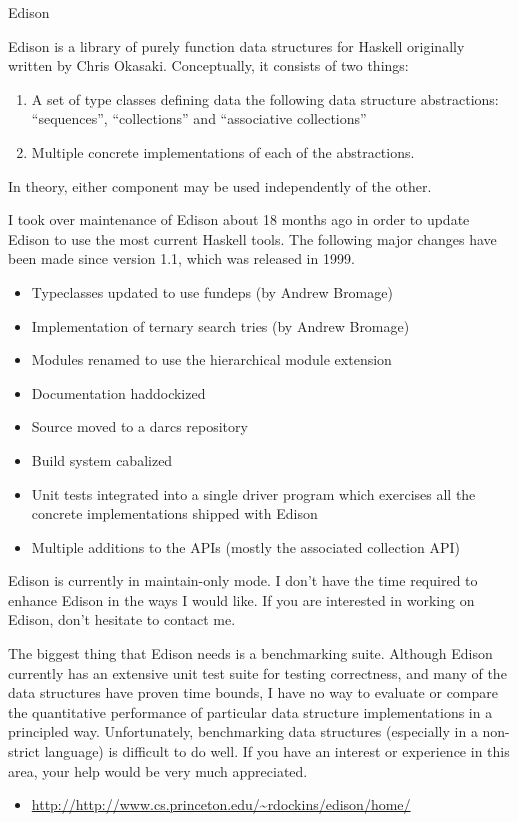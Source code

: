 \documentclass{article}
\begin{document}
\begin{hcarentry}{Edison}
\makeheader

Edison is a library of purely function data structures for Haskell
originally written by Chris Okasaki.  Conceptually, it consists of two
things:
\begin{enumerate}
\item A set of type classes defining data the following data structure
      abstractions: ``sequences'', ``collections'' and ``associative collections''
\item Multiple concrete implementations of each of the abstractions.
\end{enumerate}


In theory, either component may be used independently of the other.

I took over maintenance of Edison about 18 months ago
in order to update Edison to use the most current Haskell tools.
The following major changes have been made since version 1.1, which
was released in 1999.

\begin{itemize}
\item Typeclasses updated to use fundeps (by Andrew Bromage)
\item Implementation of ternary search tries (by Andrew Bromage)
\item Modules renamed to use the hierarchical module extension
\item Documentation haddockized
\item Source moved to a darcs repository
\item Build system cabalized
\item Unit tests integrated into a single driver program which exercises
      all the concrete implementations shipped with Edison
\item Multiple additions to the APIs (mostly the associated collection API)
\end{itemize}


Edison is currently in maintain-only mode. I don't have the time required
to enhance Edison in the ways I would like.  If you are interested in
working on Edison, don't hesitate to contact me.

The biggest thing that Edison needs is a benchmarking suite.  Although
Edison currently has an extensive unit test suite for testing correctness,
and many of the data structures have proven time bounds,
I have no way to evaluate or compare the quantitative
performance of particular data structure implementations in a
principled way.  Unfortunately, benchmarking data structures
(especially in a non-strict language) is difficult to do well.
If you have an interest or experience in this area, your help
would be very much appreciated.

\FurtherReading
\begin{itemize}
\item \url{http://http://www.cs.princeton.edu/~rdockins/edison/home/}
\end{itemize}
\end{hcarentry}
\end{document}
